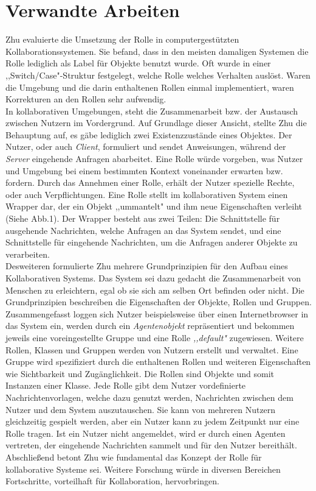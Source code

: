 \documentclass[conference]{IEEEtran}
\begin{document}
\section{Verwandte Arbeiten} Zhu evaluierte die Umsetzung der Rolle in computergestützten Kollaborationssystemen\cite{zhu2006role}. Sie befand, dass in den meisten damaligen Systemen die Rolle lediglich als Label für Objekte benutzt wurde. Oft wurde in einer ,,Switch/Case"-Struktur festgelegt, welche Rolle welches Verhalten auslöst. Waren die Umgebung und die darin enthaltenen Rollen einmal implementiert, waren Korrekturen an den Rollen sehr aufwendig.\\ In kollaborativen Umgebungen, steht die Zusammenarbeit bzw. der Austausch zwischen Nutzern im Vordergrund. Auf Grundlage dieser Ansicht, stellte Zhu die Behauptung auf, es gäbe lediglich zwei Existenzzustände eines Objektes. Der Nutzer, oder auch \textit{Client}, formuliert und sendet Anweisungen, während der \textit{Server} eingehende Anfragen abarbeitet. Eine Rolle würde vorgeben, was Nutzer und Umgebung bei einem bestimmten Kontext voneinander erwarten bzw. fordern. Durch das Annehmen einer Rolle, erhält der Nutzer spezielle Rechte, oder auch Verpflichtungen. Eine Rolle stellt im kollaborativen System einen Wrapper dar, der ein Objekt ,,ummantelt" und ihm neue Eigenschaften verleiht (Siehe Abb.1). Der Wrapper besteht aus zwei Teilen: Die Schnittstelle für ausgehende Nachrichten, welche Anfragen an das System sendet, und eine Schnittstelle für eingehende Nachrichten, um die Anfragen anderer Objekte zu verarbeiten. \\ Desweiteren formulierte Zhu mehrere Grundprinzipien für den Aufbau eines Kollaborativen Systems. Das System sei dazu gedacht die Zusammenarbeit von Menschen zu erleichtern, egal ob sie sich am selben Ort befinden oder nicht. Die Grundprinzipien beschreiben die Eigenschaften der Objekte, Rollen und Gruppen. Zusammengefasst loggen sich Nutzer beispielsweise über einen Internetbrowser in das System ein, werden durch ein \textit{Agentenobjekt} repräsentiert und bekommen jeweils eine voreingestellte Gruppe und eine Rolle \textit{,,default"} zugewiesen. Weitere Rollen, Klassen und Gruppen werden von Nutzern erstellt und verwaltet. Eine Gruppe wird spezifiziert durch die enthaltenen Rollen und weiteren Eigenschaften wie Sichtbarkeit und Zugänglichkeit. Die Rollen sind Objekte und somit Instanzen einer Klasse. Jede Rolle gibt dem Nutzer vordefinierte Nachrichtenvorlagen, welche dazu genutzt werden, Nachrichten zwischen dem Nutzer und dem System auszutauschen. Sie kann von mehreren Nutzern gleichzeitig gespielt werden, aber ein Nutzer kann zu jedem Zeitpunkt nur eine Rolle tragen. Ist ein Nutzer nicht angemeldet, wird er durch einen Agenten vertreten, der eingehende Nachrichten sammelt und für den Nutzer bereithält.\\ Abschließend betont Zhu wie fundamental das Konzept der Rolle für kollaborative Systeme sei. Weitere Forschung würde in diversen Bereichen Fortschritte, vorteilhaft für Kollaboration, hervorbringen.
\end{document}

